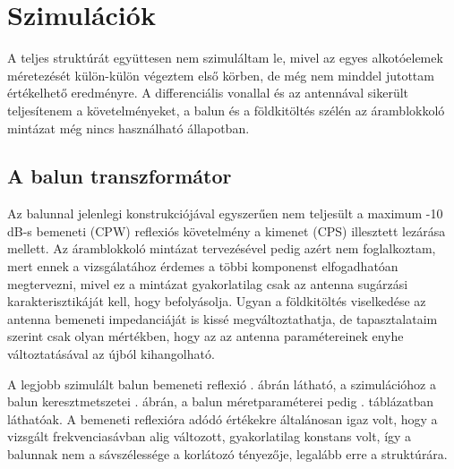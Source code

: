 \chapter{Szimulációk}
A teljes struktúrát együttesen nem szimuláltam le, mivel az egyes alkotóelemek méretezését külön-külön végeztem első körben, de még nem minddel jutottam értékelhető eredményre. A differenciális vonallal és az antennával sikerült teljesítenem a követelményeket, a balun és a földkitöltés szélén az áramblokkoló mintázat még nincs használható állapotban.
\section{A balun transzformátor}
\par Az balunnal jelenlegi konstrukciójával egyszerűen nem teljesült a maximum -10 dB-s bemeneti (CPW) reflexiós követelmény a kimenet (CPS) illesztett lezárása mellett. Az áramblokkoló mintázat tervezésével pedig azért nem foglalkoztam, mert ennek a vizsgálatához érdemes a többi komponenst elfogadhatóan megtervezni, mivel ez a mintázat gyakorlatilag csak az antenna sugárzási karakterisztikáját kell, hogy befolyásolja. Ugyan a földkitöltés viselkedése az antenna bemeneti impedanciáját is kissé megváltoztathatja, de tapasztalataim szerint csak olyan mértékben, hogy az az antenna paramétereinek enyhe változtatásával az újból kihangolható.
\par A legjobb szimulált balun bemeneti reflexió . ábrán látható, a szimulációhoz a balun keresztmetszetei . ábrán, a balun méretparaméterei pedig . táblázatban láthatóak. A bemeneti reflexióra adódó értékekre általánosan igaz volt, hogy a vizsgált frekvenciasávban alig változott, gyakorlatilag konstans volt, így a balunnak nem a sávszélessége a korlátozó tényezője, legalább erre a struktúrára.
